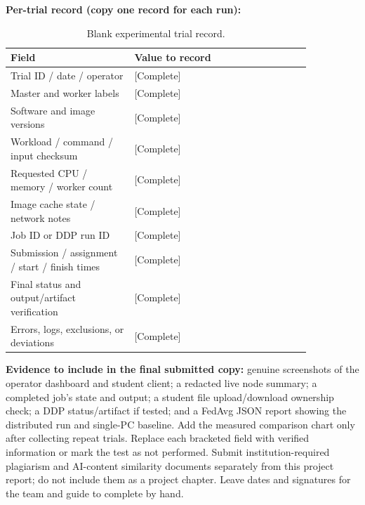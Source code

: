 \documentclass{article}
\begin{document}
\textbf{Per-trial record (copy one record for each run):}
\begin{table}[h!]
\centering
\caption{Blank experimental trial record.}
\label{tab:trial-record}
\begin{tabular}{|p{0.35\linewidth}|p{0.5\linewidth}|}
\hline
Field & Value to record \\
\hline
Trial ID / date / operator & [Complete] \\
\hline
Master and worker labels & [Complete] \\
\hline
Software and image versions & [Complete] \\
\hline
Workload / command / input checksum & [Complete] \\
\hline
Requested CPU / memory / worker count & [Complete] \\
\hline
Image cache state / network notes & [Complete] \\
\hline
Job ID or DDP run ID & [Complete] \\
\hline
Submission / assignment / start / finish times & [Complete] \\
\hline
Final status and output/artifact verification & [Complete] \\
\hline
Errors, logs, exclusions, or deviations & [Complete] \\
\hline
\end{tabular}
\end{table}

\textbf{Evidence to include in the final submitted copy:} genuine screenshots of the operator dashboard and student client; a redacted live node summary; a completed job's state and output; a student file upload/download ownership check; a DDP status/artifact if tested; and a FedAvg JSON report showing the distributed run and single-PC baseline. Add the measured comparison chart only after collecting repeat trials. Replace each bracketed field with verified information or mark the test as not performed. Submit institution-required plagiarism and AI-content similarity documents separately from this project report; do not include them as a project chapter. Leave dates and signatures for the team and guide to complete by hand.
\end{document}

